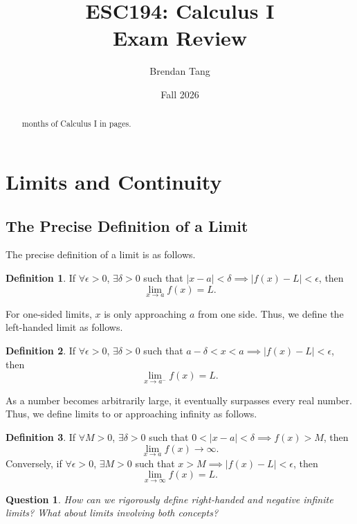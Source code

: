\documentclass[11pt]{scrartcl}
\title{ESC194: Calculus I \\ Exam Review}
\author{Brendan Tang}
\date{Fall 2026}
\theoremstyle{plain}
\newtheorem*{question}{Question}
\theoremstyle{definition}
\newtheorem*{definition}{Definition}
\theoremstyle{remark}
\begin{document}
\maketitle
\thispagestyle{empty}

\begin{abstract}
     months of Calculus I in \pageref*{LastPage} pages.
\end{abstract}

\tableofcontents
\newpage

\section{Limits and Continuity}
\subsection{The Precise Definition of a Limit}

The precise definition of a limit is as follows.

\begin{definition}
    If $\forall\epsilon>0$, $\exists\delta>0$ such that $\lvert x-a \rvert<\delta\implies
    \lvert f(x)-L \rvert<\epsilon$, then \[ \lim_{x \to a}f(x)=L. \]
\end{definition}

For one-sided limits, $x$ is only approaching $a$ from one side. Thus, we define the left-handed
limit as follows.

\begin{definition}
    If $\forall\epsilon>0$, $\exists\delta>0$ such that $a-\delta<x<a\implies \lvert f(x)-L \rvert
    <\epsilon$, then \[ \lim_{ x \to a^- }f(x)=L. \]
\end{definition}

As a number becomes arbitrarily large, it eventually surpasses every real number. Thus, we define
limits to or approaching infinity as follows.

\begin{definition}
    If $\forall M>0$, $\exists\delta>0$ such that $0<\lvert x-a \rvert<\delta\implies f(x)>M$, then
    \[ \lim_{ x \to a }f(x) \to \infty. \]
    Conversely, if $\forall\epsilon>0$, $\exists M>0$ such that $x>M\implies \lvert f(x)-L \rvert
    <\epsilon$, then \[ \lim_{ x \to \infty }f(x)=L. \]
\end{definition}

\begin{question}
    How can we rigorously define right-handed and negative infinite limits? What about limits 
    involving both concepts?
\end{question}
\end{document}
